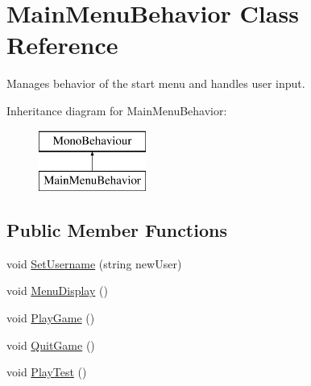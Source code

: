 \hypertarget{class_main_menu_behavior}{}\section{Main\+Menu\+Behavior Class Reference}
\label{class_main_menu_behavior}


Manages behavior of the start menu and handles user input.  


Inheritance diagram for Main\+Menu\+Behavior\+:\begin{figure}[H]
\begin{center}
\leavevmode
\includegraphics[height=2.000000cm]{class_main_menu_behavior}
\end{center}
\end{figure}
\subsection*{Public Member Functions}
\begin{DoxyCompactItemize}
\item 
void \mbox{\hyperlink{class_main_menu_behavior_a248fc73ca12d3bd0ded59da658a53df8}{Set\+Username}} (string new\+User)
\item 
void \mbox{\hyperlink{class_main_menu_behavior_a8f404fbb0c8212fa405a7c79a051e120}{Menu\+Display}} ()
\item 
void \mbox{\hyperlink{class_main_menu_behavior_ae01826edae2c48636a5ba76bfa193ea6}{Play\+Game}} ()
\item 
void \mbox{\hyperlink{class_main_menu_behavior_a90c233e4e405f363cdde95ecc0532b17}{Quit\+Game}} ()
\item 
void \mbox{\hyperlink{class_main_menu_behavior_a781e8e3a21a016ef2c3c6410d20c1026}{Play\+Test}} ()
\end{DoxyCompactItemize}
